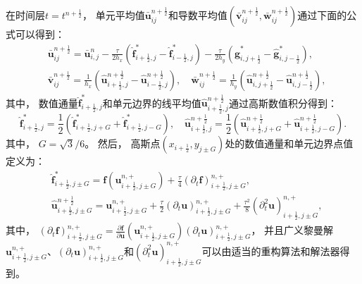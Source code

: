 \vspace{0.3\baselineskip} %
在时间层$t=t^{n+\frac{1}{2}}$，
单元平均值$\bar{\bm{u}}_{ij}^{n+\frac{1}{2}}$和导数平均值$(\bar{\bm{v}}_{ij}^{n+\frac{1}{2}}, \bar{\bm{w}}_{ij}^{n+\frac{1}{2}})$通过下面的公式可以得到：
\begin{equation}
  \begin{aligned}
     & \bar{\bm{u}}_{ij}^{n+\frac 12}=\bar{\bm{u}}_{i, j}^{n}-\frac{\tau}{2 h_x} \left(\hat{\bm{f}}_{i+\frac 12, j}^*-\hat{\bm{f}}_{i-\frac 12, j}^*\right)-\frac{\tau}{2 h_y} \left(\hat{\bm{g}}_{i, j+\frac 12}^*-\hat{\bm{g}}_{i, j-\frac 12}^*\right), \\
     & \bar{\bm{v}}_{ij}^{n+\frac 12}=\frac{1}{h_x} \left(\hat {\bm{u}}_{i+\frac 12, j}^{n+\frac 12}-\hat {\bm{u}}_{i-\frac 12, j}^{n+\frac 12}\right), \quad
    \bar{\bm{w}}_{ij}^{n+\frac 12}=\frac{1}{h_y} \left(\hat {\bm{u}}_{i, j+\frac 12}^{n+\frac 12}-\hat {\bm{u}}_{i, j-\frac 12}^{n+\frac 12}\right),
  \end{aligned}
\end{equation}
其中，
数值通量$\hat{\bm{f}}_{i+\frac 12, j}^*$和单元边界的线平均值$\hat {\bm{u}}_{i+\frac 12, j}^{n+\frac 12}$通过高斯数值积分得到：
\begin{equation}
  \label{eq:Gaussian-integral}
  \hat{\bm{f}}_{i+\frac 12, j}^*=\frac 12 \left(\hat{\bm{f}}^*_{i+\frac 12, j+G}+\hat{\bm{f}}^*_{i+\frac 12, j-G}\right), \quad
  \hat {\bm{u}}_{i+\frac 12, j}^{n+\frac 12}=\frac 12 \left(\hat {\bm{u}}_{i+\frac 12, j+G}^{n+\frac 12}+\hat {\bm{u}}_{i+\frac 12, j-G}^{n+\frac 12}\right).
\end{equation}
其中，
$G={\sqrt{3}}/{6}$。
然后，
高斯点$(x_{i+\frac{1}{2}},y_{j \pm G})$处的数值通量和单元边界点值定义为：
\begin{align}
   & \hat{\bm{f}}^*_{i+\frac{1}{2},j \pm G}={\bm{f}} \left({\bm{u}}_{i+\frac{1}{2},j \pm G}^{n, +}\right) +\frac{\tau}{4} \left({\partial_{t}}{\bm{f}}\right)_{i+\frac{1}{2},j \pm G}^{n, +},                                                                             \\
   & \hat {\bm{u}}_{i+\frac{1}{2},j \pm G}^{n+\frac 12}={\bm{u}}_{i+\frac{1}{2},j \pm G}^{n, +}+\frac{\tau}{2} \left({\partial_{t}}{\bm{u}}\right)_{i+\frac{1}{2},j \pm G}^{n, +}+\frac{\tau^2}{8} \left({\partial_{t}^2}{\bm{u}}\right)_{i+\frac{1}{2},j \pm G}^{n, +},
\end{align}
其中，
$\left({\partial_{t}}{\bm{f}}\right)_{i+\frac{1}{2},j \pm G}^{n, +} = \frac{\partial{\bm{f}}}{\partial{\bm{u}}}\left({\bm{u}}_{i+\frac{1}{2},j \pm G}^{n, +}\right) \left({\partial_{t}}{\bm{u}}\right)_{i+\frac{1}{2},j \pm G}^{n, +}$，
并且广义黎曼解${\bm{u}}_{i+\frac{1}{2},j \pm G}^{n, +}$、$\left({\partial_{t}}{\bm{u}}\right)_{i+\frac{1}{2},j \pm G}^{n, +}$和$\left({\partial_{t}^2}{\bm{u}}\right)_{i+\frac{1}{2},j \pm G}^{n, +}$可以由适当的重构算法和解法器得到。


